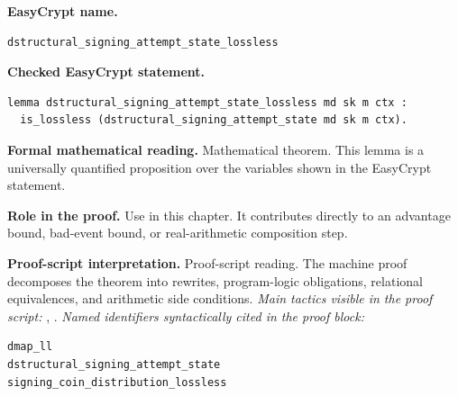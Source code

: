\begin{formaltheorem}
\noindent\textbf{EasyCrypt name.}
\begin{lstlisting}[language=EasyCrypt,basicstyle=\ttfamily\scriptsize]
dstructural_signing_attempt_state_lossless
\end{lstlisting}
\noindent\textbf{Checked EasyCrypt statement.}
\begin{lstlisting}[language=EasyCrypt,basicstyle=\ttfamily\scriptsize]
lemma dstructural_signing_attempt_state_lossless md sk m ctx :
  is_lossless (dstructural_signing_attempt_state md sk m ctx).
\end{lstlisting}
\noindent\textbf{Formal mathematical reading.}
Mathematical theorem. This lemma is a universally quantified proposition over the variables shown in the EasyCrypt statement.

\noindent\textbf{Role in the proof.}
Use in this chapter. It contributes directly to an advantage bound, bad-event bound, or real-arithmetic composition step.

\noindent\textbf{Proof-script interpretation.}
Proof-script reading. The machine proof decomposes the theorem into rewrites, program-logic obligations, relational equivalences, and arithmetic side conditions.
\emph{Main tactics visible in the proof script:} , .
\emph{Named identifiers syntactically cited in the proof block:}
\begin{lstlisting}[language=EasyCrypt,basicstyle=\ttfamily\scriptsize]
dmap_ll
dstructural_signing_attempt_state
signing_coin_distribution_lossless
\end{lstlisting}

\end{formaltheorem}

